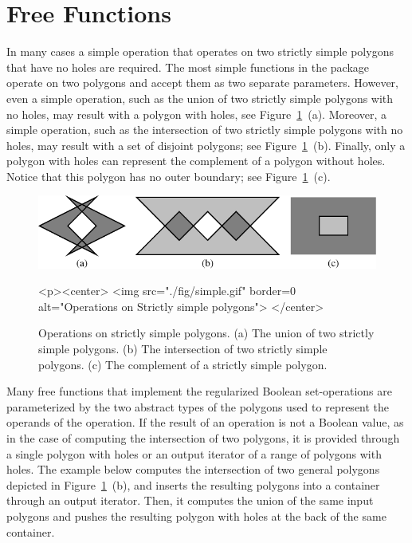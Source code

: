 \section{Free Functions}
\label{bso_sec:free_functions}
In many cases a simple operation that operates on two strictly simple
polygons that have no holes are required. The most simple functions in
the package operate on two polygons and accept them as two separate
parameters. However, even a simple operation, such as the union of two
strictly simple polygons with no holes, may result with a polygon with
holes, see Figure~\ref{fig:simple}~(a). Moreover, a simple operation,
such as the intersection of two strictly simple polygons with no holes, 
may result with a set of disjoint polygons; see
Figure~\ref{fig:simple}~(b). Finally, only a polygon with holes can
represent the complement of a polygon without holes. Notice that this
polygon has no outer boundary; see Figure~\ref{fig:simple}~(c).

\begin{figure}[!htp]
\begin{ccTexOnly}
  \begin{center}
  \includegraphics{Boolean_set_operations_2/fig/simple}
  \end{center}
\end{ccTexOnly}
\label{fig:simple}
\begin{ccHtmlOnly}
  <p><center>
    <img src="./fig/simple.gif" border=0 alt="Operations on Strictly
    simple polygons">
  </center>
\end{ccHtmlOnly}
\caption{Operations on strictly simple polygons. (a) The union of two
strictly simple polygons. (b) The intersection of two strictly simple
polygons. (c) The complement of a strictly simple polygon.} 
\end{figure}

Many free functions that implement the regularized Boolean 
set-operations are parameterized by the two abstract types of the polygons 
used to represent the operands of the operation. If the result of an 
operation is not a Boolean value, as in the case of computing the 
intersection of two polygons, it is provided through a single polygon with 
holes or an output iterator of a range of polygons with holes. The example
below computes the intersection of two general polygons depicted in 
Figure~\ref{fig:simple}~(b), and inserts the resulting polygons into a 
container through an output iterator. Then, it computes the union of the
same input polygons and pushes the resulting polygon with holes at the
back of the same container. 

